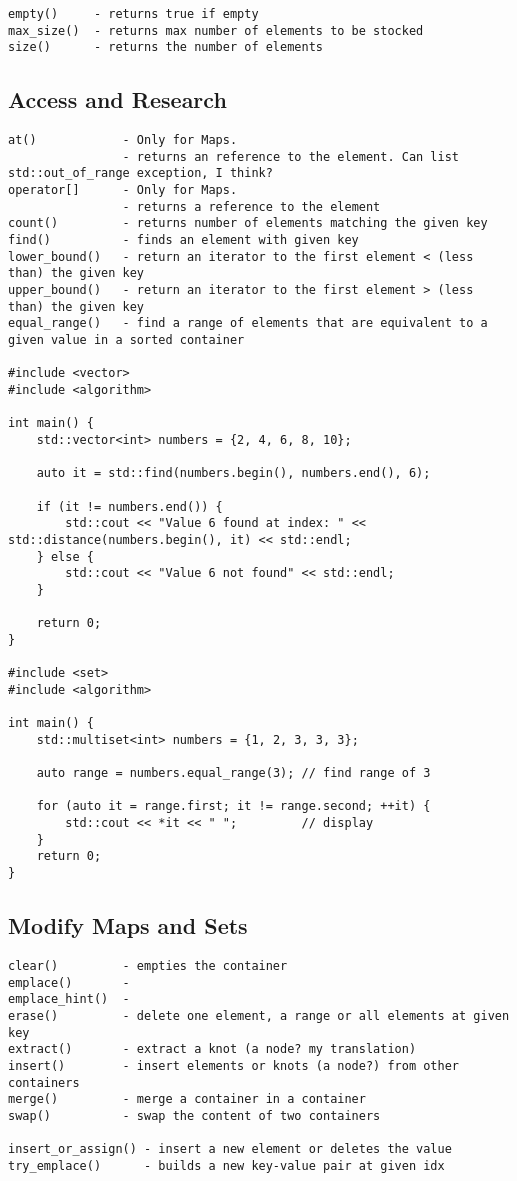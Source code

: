 \documentclass[openany]{report}
\begin{document}
\begin{verbatim}
empty()     - returns true if empty
max_size()  - returns max number of elements to be stocked
size()      - returns the number of elements
\end{verbatim}

\subsection{Access and Research}

\begin{verbatim}
at()            - Only for Maps.
                - returns an reference to the element. Can list std::out_of_range exception, I think? 
operator[]      - Only for Maps.
                - returns a reference to the element
count()         - returns number of elements matching the given key
find()          - finds an element with given key
lower_bound()   - return an iterator to the first element < (less than) the given key
upper_bound()   - return an iterator to the first element > (less than) the given key
equal_range()   - find a range of elements that are equivalent to a given value in a sorted container

#include <vector>
#include <algorithm>

int main() {
    std::vector<int> numbers = {2, 4, 6, 8, 10};

    auto it = std::find(numbers.begin(), numbers.end(), 6);

    if (it != numbers.end()) {
        std::cout << "Value 6 found at index: " << std::distance(numbers.begin(), it) << std::endl;
    } else {
        std::cout << "Value 6 not found" << std::endl;
    }

    return 0;
}

#include <set>
#include <algorithm>

int main() {
    std::multiset<int> numbers = {1, 2, 3, 3, 3};

    auto range = numbers.equal_range(3); // find range of 3

    for (auto it = range.first; it != range.second; ++it) {
        std::cout << *it << " ";         // display
    }
    return 0;
}
\end{verbatim}

\subsection{Modify Maps and Sets}

\begin{verbatim}
clear()         - empties the container
emplace()       -    
emplace_hint()  -  
erase()         - delete one element, a range or all elements at given key
extract()       - extract a knot (a node? my translation)
insert()        - insert elements or knots (a node?) from other containers
merge()         - merge a container in a container 
swap()          - swap the content of two containers 

insert_or_assign() - insert a new element or deletes the value
try_emplace()      - builds a new key-value pair at given idx
\end{verbatim}
\end{document}
